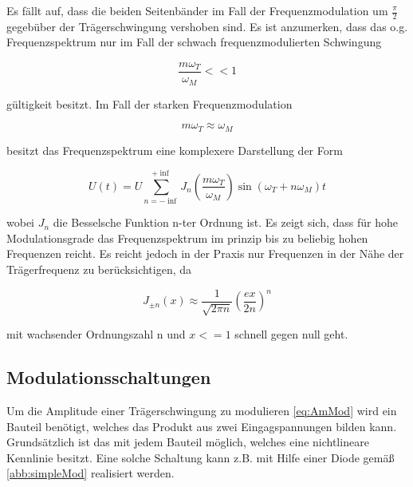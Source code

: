 Es fällt auf, dass die beiden Seitenbänder im Fall der Frequenzmodulation um $\frac{\pi}{2}$ gegebüber der Trägerschwingung vershoben sind. Es ist anzumerken, dass das o.g. Frequenzspektrum nur im Fall der schwach frequenzmodulierten Schwingung

\begin{equation}
\frac{m\omega_T}{\omega_M} << 1
\end{equation}

gültigkeit besitzt. Im Fall der starken Frequenzmodulation

\begin{equation}
m\omega_T \approx \omega_M
\end{equation}

besitzt das Frequenzspektrum eine komplexere Darstellung der Form

\begin{equation}
U(t) = U \sum_{n=-\inf}^{+\inf} J_{n}(\frac{m\omega_T}{\omega_M})\sin(\omega_T + n\omega_M)t 
\end{equation}

wobei $J_n$ die Besselsche Funktion n-ter Ordnung ist. Es zeigt sich, dass für hohe Modulationsgrade das Frequenzspektrum im prinzip bis zu beliebig hohen Frequenzen reicht. Es reicht jedoch in der Praxis nur Frequenzen in der Nähe der Trägerfrequenz zu berücksichtigen, da

\begin{equation}
J_{\pm n}(x) \approx \frac{1}{\sqrt{2\pi n}}(\frac{ex}{2n})^n
\end{equation}

mit wachsender Ordnungszahl n und $x <= 1$ schnell gegen null geht.

\subsection{Modulationsschaltungen}
Um die Amplitude einer Trägerschwingung zu modulieren \ref{eq:AmMod} wird ein Bauteil benötigt, welches das Produkt aus zwei Eingagspannungen bilden kann. Grundsätzlich ist das mit jedem Bauteil möglich, welches eine nichtlineare Kennlinie besitzt.
Eine solche Schaltung kann z.B. mit Hilfe einer Diode gemäß \ref{abb:simpleMod} realisiert werden.

